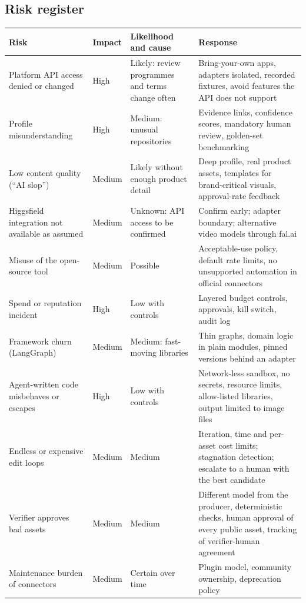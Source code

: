 \documentclass[11pt,a4paper]{article}
\begin{document}
\subsection{Risk register}
\begin{longtable}{@{}p{3.6cm}p{1.6cm}p{4.4cm}p{5.7cm}@{}}
\toprule
\textbf{Risk} & \textbf{Impact} & \textbf{Likelihood and cause} & \textbf{Response}\\
\midrule
\endhead
Platform API access denied or changed & High & Likely: review programmes and terms change often & Bring-your-own apps, adapters isolated, recorded fixtures, avoid features the API does not support\\
Profile misunderstanding & High & Medium: unusual repositories & Evidence links, confidence scores, mandatory human review, golden-set benchmarking\\
Low content quality (``AI slop'') & Medium & Likely without enough product detail & Deep profile, real product assets, templates for brand-critical visuals, approval-rate feedback\\
Higgsfield integration not available as assumed & Medium & Unknown: API access to be confirmed & Confirm early; adapter boundary; alternative video models through fal.ai\\
Misuse of the open-source tool & Medium & Possible & Acceptable-use policy, default rate limits, no unsupported automation in official connectors\\
Spend or reputation incident & High & Low with controls & Layered budget controls, approvals, kill switch, audit log\\
Framework churn (LangGraph) & Medium & Medium: fast-moving libraries & Thin graphs, domain logic in plain modules, pinned versions behind an adapter\\
Agent-written code misbehaves or escapes & High & Low with controls & Network-less sandbox, no secrets, resource limits, allow-listed libraries, output limited to image files\\
Endless or expensive edit loops & Medium & Medium & Iteration, time and per-asset cost limits; stagnation detection; escalate to a human with the best candidate\\
Verifier approves bad assets & Medium & Medium & Different model from the producer, deterministic checks, human approval of every public asset, tracking of verifier-human agreement\\
Maintenance burden of connectors & Medium & Certain over time & Plugin model, community ownership, deprecation policy\\

\end{longtable}
\end{document}
